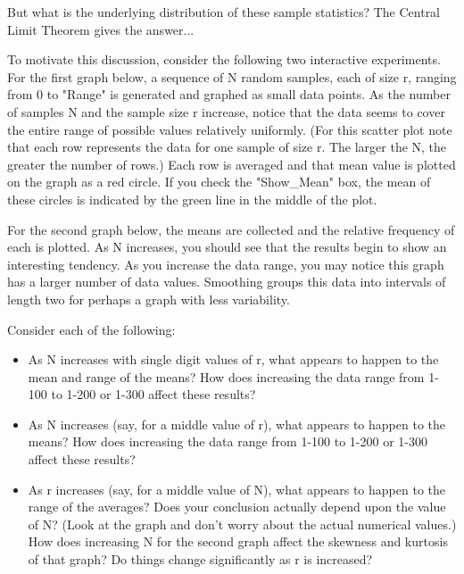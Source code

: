 \documentclass[10pt,]{book}
\theoremstyle{plain}
\theoremstyle{definition}
\theoremstyle{definition}
\numberwithin{equation}{section}
\begin{document}
But what is the underlying distribution of these sample statistics?  The Central Limit Theorem gives the answer...%
\par
To motivate this discussion, consider the following two interactive experiments.  For the first graph below, a sequence of N random samples, each of size r, ranging from 0 to "Range" is generated and graphed as small data points.  As the number of samples N and the sample size r increase, notice that the data seems to cover the entire range of possible values relatively uniformly.  (For this scatter plot note that each row represents the data for one sample of size r.  The larger the N, the greater the number of rows.)  Each row is averaged and that mean value is plotted on the graph as a red circle.  If you check the "Show_Mean" box, the mean of these circles is indicated by the green line in the middle of the plot.
%
\par

For the second graph below, the means are collected and the relative frequency of each is plotted.  As N increases, you should see that the results begin to show an interesting tendency.   As you increase the data range, you may notice this graph has a larger number of data values.  Smoothing groups this data into intervals of length two for perhaps a graph with less variability.
%
\par

Consider each of the following:
\leavevmode%
\begin{itemize}[label=\textbullet]
\item{}
As N increases with single digit values of r, what appears to happen to the mean and range of the means?  How does increasing the data range from 1-100 to 1-200 or 1-300 affect these results?%
\item{}As N increases (say, for a middle value of r), what appears to happen to the means?  How does increasing the data range from 1-100 to 1-200 or 1-300 affect these results?%
\item{}As r increases (say, for a middle value of N), what appears to happen to the range of the averages?  Does your conclusion actually depend upon the value of N?  (Look at the graph and don't worry about the actual numerical values.)
How does increasing N for the second graph affect the skewness and kurtosis of that graph?  Do things change significantly as r is increased?  %
\end{itemize}
\end{document}
